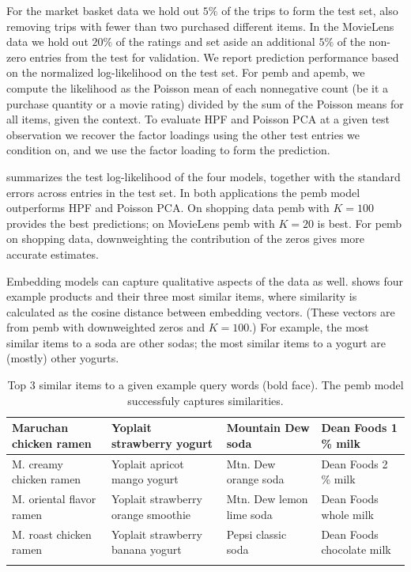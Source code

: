 \documentclass[12pt]{article}
\begin{document}
 For the market basket data we hold out $5\%$ of
the trips to form the test set, also removing trips with fewer than
two purchased different items. In the MovieLens data we hold out
$20\%$ of the ratings and set aside an additional $5\%$ of the
non-zero entries from the test for validation.  We report prediction
performance based on the normalized log-likelihood on the test
set. For \gls{pemb} and \gls{apemb}, we compute the likelihood as the
Poisson mean of each nonnegative count (be it a purchase quantity or a
movie rating) divided by the sum of the Poisson means for all items,
given the context. To evaluate \gls{HPF} and Poisson \gls{PCA} at a
given test observation we recover the factor loadings using the other
test entries we condition on, and we use the factor loading to form
the prediction.

 summarizes the test log-likelihood of
the four models, together with the standard errors across entries in
the test set. In both applications the \gls{pemb} model outperforms
\gls{HPF} and Poisson \gls{PCA}. On shopping data \gls{pemb} with
$K=100$ provides the best predictions; on MovieLens \gls{pemb} with
$K=20$ is best. For \gls{pemb} on shopping data, downweighting the
contribution of the zeros gives more accurate estimates.

 Embedding models can
capture qualitative aspects of the data as well.
 shows four example products and their three
most similar items, where similarity is calculated as the cosine
distance between embedding vectors. (These vectors are from \gls{pemb}
with downweighted zeros and $K=100$.) For example, the most similar items to a soda are
other sodas; the most similar items to a yogurt are (mostly) other
yogurts.

\begin{table}
	\centering
	\scriptsize
	\begin{tabular}{llll} \toprule
		{\bf Maruchan chicken ramen}  		& {\bf Yoplait strawberry yogurt} 	& {\bf Mountain Dew soda}      & {\bf Dean Foods  1 \% milk} \\ \hline
		M. creamy chicken ramen		& Yoplait apricot mango yogurt        	& Mtn. Dew orange soda     & Dean Foods 2 \% milk \\
		M. oriental flavor ramen		& Yoplait strawberry orange smoothie   	& Mtn. Dew lemon lime soda & Dean Foods whole milk \\
		M. roast chicken ramen  		& Yoplait strawberry banana yogurt     	& Pepsi classic soda	       & Dean Foods chocolate milk \\ \bottomrule \\
	\end{tabular} 
	\caption{Top 3 similar items to a given example query words (bold face). The \gls{pemb} model successfuly captures similarities.\label{tab:iri_some_queries}}
\vspace{-10pt}
\end{table}
\end{document}
